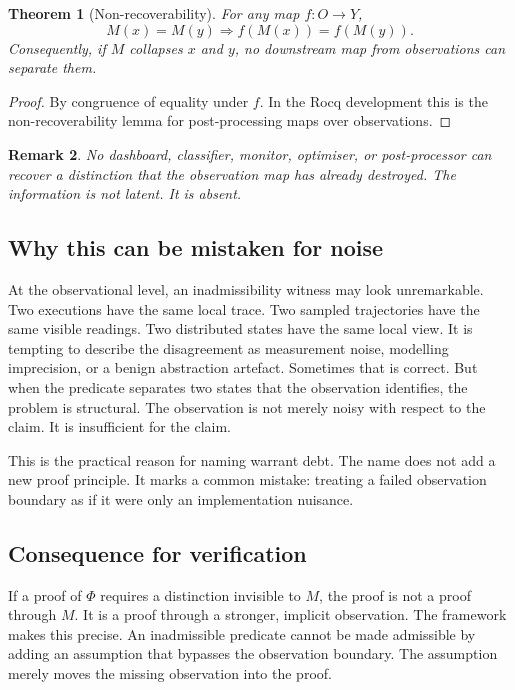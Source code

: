 \documentclass[a4paper,11pt]{article}
\newtheorem{theorem}{Theorem}[section]
\newtheorem{remark}[theorem]{Remark}
\begin{document}
\begin{theorem}[Non-recoverability]
\label{thm:no-recovery}
For any map \(f : O \to Y\),
\[
  M(x) = M(y) \Longrightarrow f(M(x)) = f(M(y)).
\]
Consequently, if \(M\) collapses \(x\) and \(y\), no downstream map from
observations can separate them.
\end{theorem}

\begin{proof}
By congruence of equality under \(f\). In the Rocq development this is the
non-recoverability lemma for post-processing maps over observations.
\end{proof}

\begin{remark}
No dashboard, classifier, monitor, optimiser, or post-processor can recover a
distinction that the observation map has already destroyed. The information is
not latent. It is absent.
\end{remark}

\subsection{Why this can be mistaken for noise}

At the observational level, an inadmissibility witness may look unremarkable.
Two executions have the same local trace. Two sampled trajectories have the
same visible readings. Two distributed states have the same local view. It is
tempting to describe the disagreement as measurement noise, modelling
imprecision, or a benign abstraction artefact. Sometimes that is correct. But
when the predicate separates two states that the observation identifies, the
problem is structural. The observation is not merely noisy with respect to the
claim. It is insufficient for the claim.

This is the practical reason for naming warrant debt. The name does not add a
new proof principle. It marks a common mistake: treating a failed observation
boundary as if it were only an implementation nuisance.

\subsection{Consequence for verification}

If a proof of \(\Phi\) requires a distinction invisible to \(M\), the proof is
not a proof through \(M\). It is a proof through a stronger, implicit
observation. The framework makes this precise. An inadmissible predicate cannot
be made admissible by adding an assumption that bypasses the observation
boundary. The assumption merely moves the missing observation into the proof.
\end{document}
